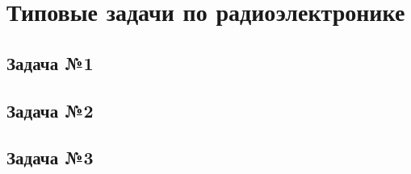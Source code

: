 \documentclass[a4paper,14pt]{extarticle}
\theoremstyle{definition}
\begin{document}
\section{Типовые задачи по радиоэлектронике}

\subsection{Задача №1}

\newpage

\subsection{Задача №2}

\newpage

\subsection{Задача №3}

\newpage
\end{document}
